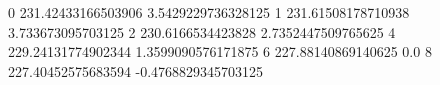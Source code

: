 0 231.42433166503906 3.5429229736328125
1 231.61508178710938 3.733673095703125
2 230.6166534423828 2.7352447509765625
4 229.24131774902344 1.3599090576171875
6 227.88140869140625 0.0
8 227.40452575683594 -0.4768829345703125
